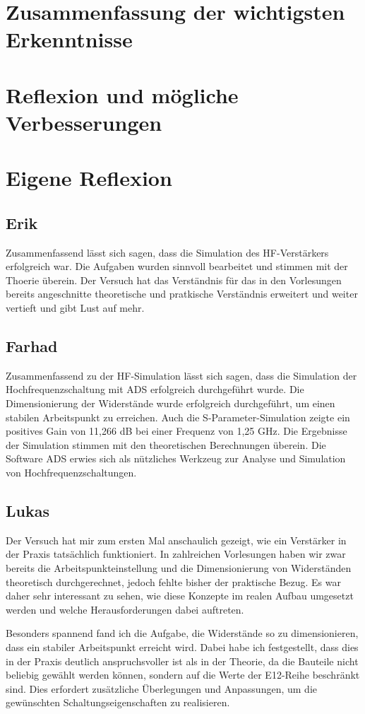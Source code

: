 
\section{Zusammenfassung der wichtigsten Erkenntnisse}
\section{Reflexion und mögliche Verbesserungen}
\section{Eigene Reflexion}
\subsection{Erik}
Zusammenfassend lässt sich sagen, dass die Simulation des HF-Verstärkers erfolgreich war. Die Aufgaben wurden sinnvoll bearbeitet und stimmen mit der Thoerie überein.
Der Versuch hat das Verständnis für das in den Vorlesungen bereits angeschnitte theoretische und pratkische Verständnis erweitert und weiter vertieft und gibt Lust auf mehr.

\subsection{Farhad}
Zusammenfassend zu der HF-Simulation lässt sich sagen, dass die Simulation der Hochfrequenzschaltung mit \ac{ADS} erfolgreich durchgeführt wurde. Die Dimensionierung der Widerstände wurde erfolgreich durchgeführt, um einen stabilen Arbeitspunkt zu erreichen. Auch die S-Parameter-Simulation zeigte ein positives Gain von 11,266 dB bei einer Frequenz von 1{,}25 GHz.
Die Ergebnisse der Simulation stimmen mit den theoretischen Berechnungen überein.
Die Software \ac{ADS} erwies sich als nützliches Werkzeug zur Analyse und Simulation von Hochfrequenzschaltungen.
\subsection{Lukas}
Der Versuch hat mir zum ersten Mal anschaulich gezeigt, wie ein Verstärker in der Praxis tatsächlich funktioniert. In zahlreichen Vorlesungen haben wir zwar bereits die Arbeitspunkteinstellung und die Dimensionierung von Widerständen theoretisch durchgerechnet, jedoch fehlte bisher der praktische Bezug. Es war daher sehr interessant zu sehen, wie diese Konzepte im realen Aufbau umgesetzt werden und welche Herausforderungen dabei auftreten.

Besonders spannend fand ich die Aufgabe, die Widerstände so zu dimensionieren, dass ein stabiler Arbeitspunkt erreicht wird. Dabei habe ich festgestellt, dass dies in der Praxis deutlich anspruchsvoller ist als in der Theorie, da die Bauteile nicht beliebig gewählt werden können, sondern auf die Werte der E12-Reihe beschränkt sind. Dies erfordert zusätzliche Überlegungen und Anpassungen, um die gewünschten Schaltungseigenschaften zu realisieren.


\clearpage